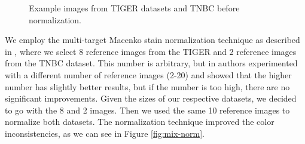 \begin{figure}[H]
  \caption{Example images from TIGER datasets \cite{tiger_dataset} and TNBC \cite{TNBC-nuclei-seg-extended} before normalization.}
  \label{fig:mix-no-norm}
\end{figure}

We employ the multi-target Macenko stain normalization technique as described in \cite{Ivanov2024}, where we select 8 reference images from the TIGER and 2 reference images from the TNBC dataset. This number is arbitrary, but in \cite{Ivanov2024} authors experimented with a different number of reference images (2-20) and showed that the higher number has slightly better results, but if the number is too high, there are no significant improvements. Given the sizes of our respective datasets, we decided to go with the 8 and 2 images. Then we used the same 10 reference images to normalize both datasets. The normalization technique improved the color inconsistencies, as we can see in Figure \ref{fig:mix-norm}.

